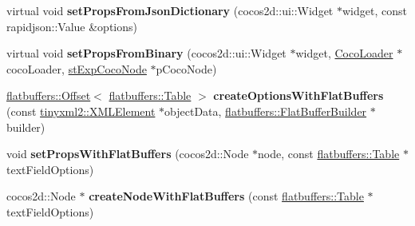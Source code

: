 \begin{DoxyCompactItemize}
virtual void {\bfseries set\+Props\+From\+Json\+Dictionary} (cocos2d\+::ui\+::\+Widget $\ast$widget, const rapidjson\+::\+Value \&options)
\item 
\mbox{\label{classcocostudio_1_1TextFieldReader_a831db4df436fc466c6be63f0043e5e54}} 
virtual void {\bfseries set\+Props\+From\+Binary} (cocos2d\+::ui\+::\+Widget $\ast$widget, \hyperlink{classcocostudio_1_1CocoLoader}{Coco\+Loader} $\ast$coco\+Loader, \hyperlink{structcocostudio_1_1stExpCocoNode}{st\+Exp\+Coco\+Node} $\ast$p\+Coco\+Node)
\item 
\mbox{\label{classcocostudio_1_1TextFieldReader_acca8a242b0de845ce21891c3cf86fa33}} 
\hyperlink{structflatbuffers_1_1Offset}{flatbuffers\+::\+Offset}$<$ \hyperlink{classflatbuffers_1_1Table}{flatbuffers\+::\+Table} $>$ {\bfseries create\+Options\+With\+Flat\+Buffers} (const \hyperlink{classtinyxml2_1_1XMLElement}{tinyxml2\+::\+X\+M\+L\+Element} $\ast$object\+Data, \hyperlink{classflatbuffers_1_1FlatBufferBuilder}{flatbuffers\+::\+Flat\+Buffer\+Builder} $\ast$builder)
\item 
\mbox{\label{classcocostudio_1_1TextFieldReader_a018c081b257755abaad292b9f29dc376}} 
void {\bfseries set\+Props\+With\+Flat\+Buffers} (cocos2d\+::\+Node $\ast$node, const \hyperlink{classflatbuffers_1_1Table}{flatbuffers\+::\+Table} $\ast$text\+Field\+Options)
\item 
\mbox{\label{classcocostudio_1_1TextFieldReader_a07e319e4646c83cbfad0c35a48b66d6d}} 
cocos2d\+::\+Node $\ast$ {\bfseries create\+Node\+With\+Flat\+Buffers} (const \hyperlink{classflatbuffers_1_1Table}{flatbuffers\+::\+Table} $\ast$text\+Field\+Options)
\end{DoxyCompactItemize}
